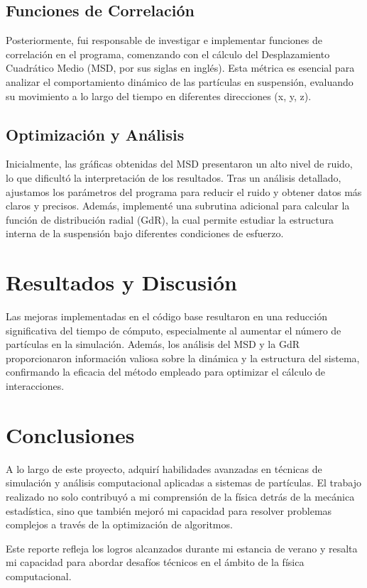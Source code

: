 \documentclass[12pt,spanish,twocolumn]{article}
\begin{document}
\subsection*{Funciones de Correlación}

Posteriormente, fui responsable de investigar e implementar funciones de correlación en el programa, comenzando con el cálculo del Desplazamiento Cuadrático Medio (MSD, por sus siglas en inglés). Esta métrica es esencial para analizar el comportamiento dinámico de las partículas en suspensión, evaluando su movimiento a lo largo del tiempo en diferentes direcciones (x, y, z).

\subsection*{Optimización y Análisis}

Inicialmente, las gráficas obtenidas del MSD presentaron un alto nivel de ruido, lo que dificultó la interpretación de los resultados. Tras un análisis detallado, ajustamos los parámetros del programa para reducir el ruido y obtener datos más claros y precisos. Además, implementé una subrutina adicional para calcular la función de distribución radial (GdR), la cual permite estudiar la estructura interna de la suspensión bajo diferentes condiciones de esfuerzo.

\section*{Resultados y Discusión}

Las mejoras implementadas en el código base resultaron en una reducción significativa del tiempo de cómputo, especialmente al aumentar el número de partículas en la simulación. Además, los análisis del MSD y la GdR proporcionaron información valiosa sobre la dinámica y la estructura del sistema, confirmando la eficacia del método empleado para optimizar el cálculo de interacciones.

\section*{Conclusiones}

A lo largo de este proyecto, adquirí habilidades avanzadas en técnicas de simulación y análisis computacional aplicadas a sistemas de partículas. El trabajo realizado no solo contribuyó a mi comprensión de la física detrás de la mecánica estadística, sino que también mejoró mi capacidad para resolver problemas complejos a través de la optimización de algoritmos.

Este reporte refleja los logros alcanzados durante mi estancia de verano y resalta mi capacidad para abordar desafíos técnicos en el ámbito de la física computacional. 
\end{document}
